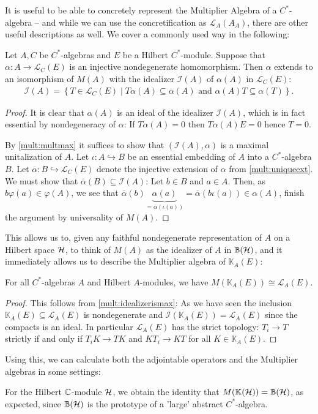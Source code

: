 It is useful to be able to concretely represent the Multiplier Algebra of a $C^*$-algebra -- and while we can use the concretification as $\mathcal{L}_A(A_A)$, there are other useful descriptions as well. We cover a commonly used way in the following:
\begin{proposition}
	Let $A,C$ be $C^*$-algebras and $E$ be a Hilbert $C^*$-module. Suppose that $\alpha \colon A \to \mathcal{L}_C(E)$ is an injective nondegenerate homomorphism. Then $\alpha$ extends to an isomorphism of $M(A)$ with the idealizer $\mathcal{I}(A)$ of $\alpha(A)$ in $\mathcal{L}_C(E)$:
	\begin{align*}
		\mathcal{I}(A)=\left\{ T \in \mathcal{L}_C(E) \mid T\alpha(A) \subseteq \alpha(A) \text{ and } \alpha(A)T \subseteq \alpha(T) \right\}.	
	\end{align*}
	\label{mult:idealizerismax}
\end{proposition}
\begin{proof}
	It is clear that $\alpha(A)$ is an ideal of the idealizer $\mathcal{I}(A)$, which is in fact essential by nondegeneracy of $\alpha$: If $T\alpha(A) = 0$ then $T\alpha(A)E = 0$ hence $T =0$.

By \ref{mult:multmax} it suffices to show that $(\mathcal{I}(A),\alpha)$ is a maximal unitalization of $A$. Let $\iota \colon A \hookrightarrow B$ be an essential embedding of $A$ into a $C^*$-algebra $B$. Let $\overline \alpha \colon B \hookrightarrow \mathcal{L}_C(E)$ denote the injective extension of $\alpha$ from \ref{mult:uniqueext}. We must show that $\overline \alpha(B) \subseteq \mathcal{I}(A)$: Let $b \in B$ and $a \in A$. Then, as $b \varphi(a) \in \varphi(A)$, we see that $\overline \alpha(b) \underbrace{\alpha(a)}_{=\overline \alpha (\iota(a))} = \overline \alpha(b \iota(a)) \in \alpha(A)$, finish the argument by universality of $M(A)$.
\end{proof}

This allows us to, given any faithful nondegenerate representation of $A$ on a Hilbert space $\mathcal{H}$, to think of $M(A)$ as the idealizer of $A$ in $\mathbb{B}(\mathcal{H})$, and it immediately allows us to describe the Multiplier algebra of $\mathbb{K}_A(E)$:
\begin{corollary}
	For all $C^*$-algebras $A$ and Hilbert $A$-modules, we have $M(\mathbb{K}_A(E))\cong \mathcal{L}_A(E)$.
\end{corollary}
\begin{proof}
	This follows from \ref{mult:idealizerismax}: As we have seen the inclusion $\mathbb{K}_A(E) \subseteq \mathcal{L}_A(E)$ is nondegenerate and $\mathcal{I}(\mathbb{K}_A(E))=\mathcal{L}_A(E)$ since the compacts is an ideal. In particular $\mathcal{L}_A(E)$ has the strict topology: $T_i \to T$ strictly if and only if $T_iK \to TK$ and $KT_i \to KT$ for all $K \in \mathbb{K}_A(E)$.
\end{proof}
Using this, we can calculate both the adjointable operators and the Multiplier algebras in some settings:
\begin{example}
	For the Hilbert $\mathbb{C}$-module $\mathcal{H}$, we obtain the identity that $M(\mathbb{K}(\mathcal{H})) = \mathbb{B}(\mathcal{H})$, as expected, since $\mathbb{B}(\mathcal{H})$ is the prototype of a 'large' abstract $C^*$-algebra.
\end{example}



